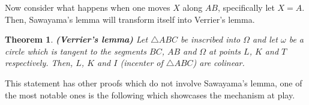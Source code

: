\documentclass{article}
\newtheorem{theorem}{Theorem}
\begin{document}
Now consider what happens when one moves \(X\) along \(AB\), specifically let \(X = A\). Then, Sawayama's lemma will transform itself into Verrier's lemma.

\begin{theorem} \textbf{(Verrier's lemma)}
Let \(\triangle ABC\) be inscribed into \(\Omega\) and let \(\omega\) be a circle which is tangent to the segments \(BC\), \(AB\) and \(\Omega\) at points \(L\), \(K\) and \(T\) respectively. Then, \(L\), \(K\) and \(I\) (incenter of \(\triangle ABC\)) are colinear. 
\end{theorem}

\begin{center}
    \centering
\end{center}

This statement has other proofs which do not involve Sawayama's lemma, one of the most notable ones is the following which showcases the mechanism at play.
\end{document}
